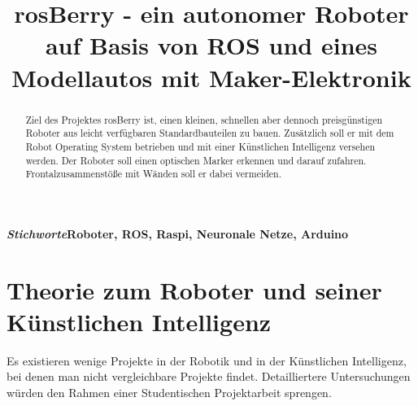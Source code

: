 \documentclass[conference]{IEEEtran}
\begin{document}
		
	\title{rosBerry - ein autonomer Roboter auf Basis von ROS und eines Modellautos mit Maker-Elektronik}
	
	\author{
		\and
		\and
	}

	
	\maketitle
	
	\begin{abstract}
		Ziel des Projektes rosBerry ist, einen kleinen, schnellen aber dennoch preisgünstigen Roboter aus leicht verfügbaren Standardbauteilen zu bauen.
		Zusätzlich soll er mit dem Robot Operating System betrieben und mit einer Künstlichen Intelligenz versehen werden.
		Der Roboter soll einen optischen Marker erkennen und darauf zufahren.
		Frontalzusammenstöße mit Wänden soll er dabei vermeiden.
	\end{abstract}

	

{\small\textbf{\textit{Stichworte}\textendash{}\textendash{}Roboter, ROS, Raspi, Neuronale Netze, Arduino}}
	
	\section{Theorie zum Roboter und seiner Künstlichen Intelligenz}
		
	Es existieren wenige Projekte in der Robotik und in der Künstlichen Intelligenz, bei denen man nicht vergleichbare Projekte findet.
	Detailliertere Untersuchungen würden den Rahmen einer Studentischen Projektarbeit sprengen.
	
\end{document}
